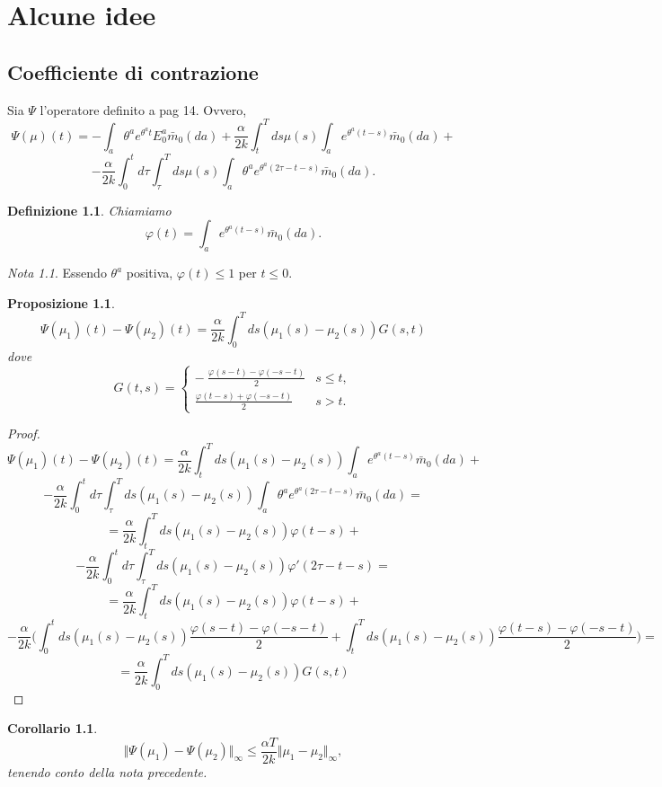 \documentclass[a4paper]{book}
\theoremstyle{plain}
\newtheorem{prop}[thm]{Proposizione}
\newtheorem{cor}[thm]{Corollario}
\theoremstyle{definizione}
\newtheorem{defn}[thm]{Definizione}
\theoremstyle{remark}
\newtheorem{rem}[thm]{Nota}
\numberwithin{equation}{section}
\begin{document}
\chapter{Alcune idee}
\section{Coefficiente di contrazione}
	Sia $\Psi$ l'operatore definito a pag 14.
	Ovvero, 
	$$\Psi(\mu)(t)=-\int_a\theta^a e^{\theta^at}E_0^a\bar{m}_0(da)+\frac{\alpha}{2k}\int_t^Tds\mu(s)\int_a e^{\theta^a(t-s)}\bar{m}_0(da)+$$
	$$-\frac{\alpha}{2k}\int_0^td\tau\int_\tau^Tds\mu(s)\int_a \theta^ae^{\theta^a(2\tau-t-s)}\bar{m}_0(da).$$
	
	\begin{defn}
	Chiamiamo $$\varphi(t)=\int_a e^{\theta^a(t-s)}\bar{m}_0(da).$$
		\end{defn}
		
	\begin{rem}
	Essendo $\theta^a$ positiva, $\varphi(t)\le 1$ per $t\le 0$.
	\end{rem}
		
	\begin{prop}
	$$\Psi(\mu_1)(t)-\Psi(\mu_2)(t)=\frac{\alpha}{2k}\int_0^T ds (\mu_1(s)-\mu_2(s))G(s,t)$$
	dove
		$$G(t,s)=\begin{cases}
	-\ \displaystyle\frac{\varphi(s-t)-\varphi(-s-t)}{2} & s\le t, \\
	\displaystyle\frac{\varphi(t-s)+\varphi(-s-t)}{2} & s>t.
	\end{cases}$$
	\end{prop}
	\begin{proof}
		$$\Psi(\mu_1)(t)-\Psi(\mu_2)(t)=\frac{\alpha}{2k}\int_t^Tds (\mu_1(s)-\mu_2(s))\int_a e^{\theta^a(t-s)}\bar{m}_0(da)+$$
	$$-\frac{\alpha}{2k}\int_0^td\tau\int_\tau^Tds (\mu_1(s)-\mu_2(s))\int_a \theta^ae^{\theta^a(2\tau-t-s)}\bar{m}_0(da)=$$
	$$=\frac{\alpha}{2k}\int_t^Tds (\mu_1(s)-\mu_2(s))\varphi(t-s)+$$
	$$-\frac{\alpha}{2k}\int_0^td\tau\int_\tau^Tds (\mu_1(s)-\mu_2(s))\varphi'(2\tau-t-s)=$$
		$$=\frac{\alpha}{2k}\int_t^Tds (\mu_1(s)-\mu_2(s))\varphi(t-s)+$$
	$$-\frac{\alpha}{2k}\bigg(\int_0^tds (\mu_1(s)-\mu_2(s))\displaystyle\frac{\varphi(s-t)-\varphi(-s-t)}{2}+\int_t^Tds (\mu_1(s)-\mu_2(s))\displaystyle\frac{\varphi(t-s)-\varphi(-s-t)}{2}\bigg)=$$
	$$=\frac{\alpha}{2k}\int_0^T ds (\mu_1(s)-\mu_2(s))G(s,t)$$
	\end{proof}
	
	\begin{cor}
	$$\Vert\Psi(\mu_1)-\Psi(\mu_2)\Vert_\infty\le \frac{\alpha T}{2k}\Vert\mu_1-\mu_2\Vert_\infty,$$ tenendo conto della nota precedente.
	\end{cor}
	
\end{document}
